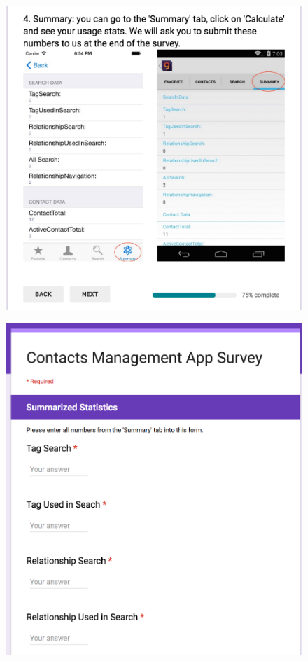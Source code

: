\documentclass{uofsthesis-cs}
\begin{document}
\begin{figure}[!h]
\begin{center}
\includegraphics[scale=0.4]{pics/survey4.png}
\end{center}
\end{figure}

\begin{figure}[!h]
\begin{center}
\includegraphics[scale=0.4]{pics/survey5.png}
\end{center}
\end{figure}
\end{document}
